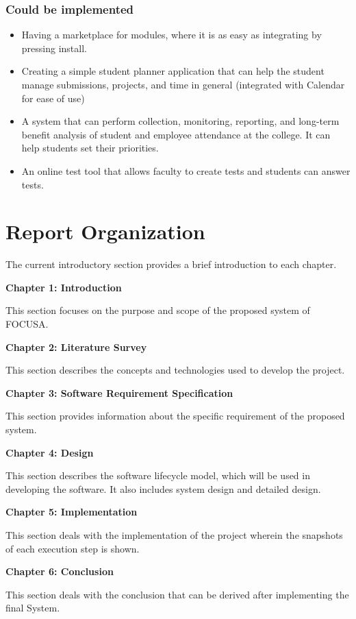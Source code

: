 \subsubsection{Could be implemented}
\begin{itemize}
    \item Having a marketplace for modules, where it is as easy as integrating by pressing install.
    \item Creating a simple student planner application that can help the student manage submissions, 
    projects, and time in general (integrated with Calendar for ease of use)
    \item A system that can perform collection, monitoring, reporting, and long-term benefit analysis of student and employee attendance at the college. It can help students set their priorities.
    \item An online test tool that allows faculty to create tests and students can answer tests.
\end{itemize}

\section{Report Organization}

The current introductory section provides a brief introduction to each chapter.

\textbf{Chapter 1: Introduction}

This section focuses on the purpose and scope of the proposed system of FOCUSA.

\textbf{Chapter 2: Literature Survey}

This section describes the concepts and technologies used to develop the project.

\textbf{Chapter 3: Software Requirement Specification}

This section provides information about the specific requirement of the proposed system.

\textbf{Chapter 4: Design}

This section describes the software lifecycle model, which will be used in developing the
software. It also includes system design and detailed design.

\textbf{Chapter 5: Implementation}

This section deals with the implementation of the project wherein the snapshots of each execution step is shown.

\textbf{Chapter 6: Conclusion}

This section deals with the conclusion that can be derived after implementing the final System.
